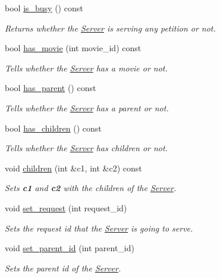 \begin{DoxyCompactItemize}
bool \hyperlink{class_server_a1bfac1f0028aea71f89e64809937306a}{is\-\_\-busy} () const 
\begin{DoxyCompactList}\small\item\em Returns whether the \hyperlink{class_server}{Server} is serving any petition or not. \end{DoxyCompactList}\item 
bool \hyperlink{class_server_a92979104e897c899d44f9ab4a5931a95}{has\-\_\-movie} (int movie\-\_\-id) const 
\begin{DoxyCompactList}\small\item\em Tells whether the \hyperlink{class_server}{Server} has a movie or not. \end{DoxyCompactList}\item 
bool \hyperlink{class_server_a1aed1fb63af9b2d8a40459f5e51422c7}{has\-\_\-parent} () const 
\begin{DoxyCompactList}\small\item\em Tells whether the \hyperlink{class_server}{Server} has a parent or not. \end{DoxyCompactList}\item 
bool \hyperlink{class_server_aab357f6115e5a102d631a28e6c99658b}{has\-\_\-children} () const 
\begin{DoxyCompactList}\small\item\em Tells whether the \hyperlink{class_server}{Server} has children or not. \end{DoxyCompactList}\item 
void \hyperlink{class_server_a3e362f139ad82a6ad64f0c32965ead19}{children} (int \&c1, int \&c2) const 
\begin{DoxyCompactList}\small\item\em Sets {\bfseries c1} and {\bfseries c2} with the children of the \hyperlink{class_server}{Server}. \end{DoxyCompactList}\item 
void \hyperlink{class_server_a6d64170bbfd9374a2f46c3919a2bba9e}{set\-\_\-request} (int request\-\_\-id)
\begin{DoxyCompactList}\small\item\em Sets the request id that the \hyperlink{class_server}{Server} is going to serve. \end{DoxyCompactList}\item 
void \hyperlink{class_server_a8a31b0d635f6c41ffb5a78b36335169d}{set\-\_\-parent\-\_\-id} (int parent\-\_\-id)
\begin{DoxyCompactList}\small\item\em Sets the parent id of the \hyperlink{class_server}{Server}. \end{DoxyCompactList}\item 

\end{DoxyCompactItemize}
